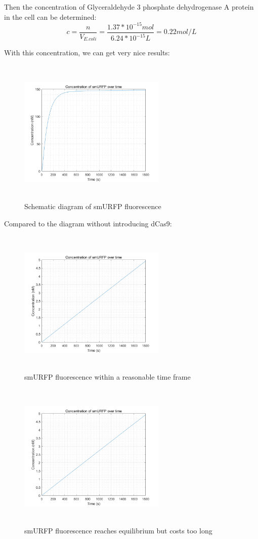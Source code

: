 Then the concentration of Glyceraldehyde 3 phosphate dehydrogenase A protein in the cell can be determined:
\begin{displaymath}
	c=\frac{n}{V_{E.coli}}=\frac{1.37*10^{-15}mol}{6.24*10^{-15}L}=0.22mol/L
\end{displaymath}

With this concentration, we can get very nice results:

\begin{figure}[!htbp]
	\centering
	\includegraphics[width=7cm,height=7cm]{23}
	\caption{Schematic diagram of smURFP fluorescence}
\end{figure}

Compared to the diagram without introducing dCas9:

\begin{figure}[!htbp]
	\centering
	\includegraphics[width=7cm,height=7cm]{21}
	\caption{smURFP fluorescence within a reasonable time frame}
\end{figure}
\begin{figure}[!htbp]
	\centering
	\includegraphics[width=7cm,height=7cm]{21}
	\caption{smURFP fluorescence reaches equilibrium but costs too long}
\end{figure}

